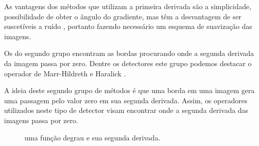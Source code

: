 As vantagens dos métodos que utilizam a primeira derivada são a simplicidade, possibilidade de obter o ângulo do gradiente, mas têm a desvantagem de ser suscetíveis a ruído \cite{comparaborda}, portanto fazendo necessário um esquema de suavização das imagens.


Os do segundo grupo encontram as bordas procurando onde a segunda derivada da imagem passa por zero. Dentre os detectores este grupo podemos destacar o operador de Marr-Hildreth \cite{marr} e Haralick \cite{haralick}.

A ideia deste segundo grupo de métodos é que uma borda em uma imagem gera uma passagem pelo valor zero em sua segunda derivada. Assim, os operadores utilizados neste tipo de detector visam encontrar onde a segunda derivada das imagens passa por zero.


\begin{figure}[h]
  \centering
  \hfill
  \caption{uma função degrau e sua segunda derivada.}
  \label{dif}
\end{figure}

